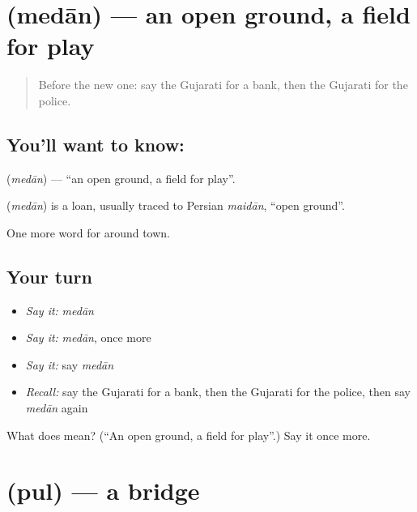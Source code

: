 \section[\texorpdfstring{\gu{મેદાન} (medān)}{મેદાન (medān)}]{ (medān) — an open ground, a field for play}

\label{lesson:GU-C84-ground}



\begin{quote}
Before the new one: say the Gujarati for a bank, then the Gujarati for the police.
\end{quote}

\subsection*{You'll want to know: }
\textbf{} (\emph{medān}) — \textquotedblleft{}an open ground, a field for play\textquotedblright{}.

\begin{cousinweb}
\textbf{} (\emph{medān}) is a loan, usually traced to Persian \emph{maidān}, \textquotedblleft{}open ground\textquotedblright{}.
\end{cousinweb}

\begin{grammarlens}[title={What you've built}]
One more word for around town.
\end{grammarlens}

\subsection*{Your turn}
\begin{itemize}
\raggedright
  \item \emph{Say it:} \emph{medān}
  \item \emph{Say it:} \emph{medān}, once more
  \item \emph{Say it:} say \emph{medān}
  \item \emph{Recall:} say the Gujarati for a bank, then the Gujarati for the police, then say \emph{medān} again
\end{itemize}

\begin{tcolorbox}[breakable,colback=teal!4,colframe=teal!35!black,title={Before you move on}]
What does  mean? (\textquotedblleft{}An open ground, a field for play\textquotedblright{}.) Say it once more.
\end{tcolorbox}
\section[\texorpdfstring{\gu{પુલ} (pul)}{પુલ (pul)}]{ (pul) — a bridge}

